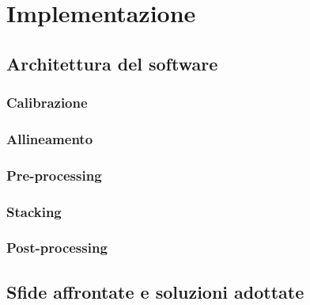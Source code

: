 \chapter{Implementazione} \label{chap:implementation}

\section{Architettura del software} \label{sec:architecture}

\subsection{Calibrazione} \label{subsec:calibration_impl}

\subsection{Allineamento} \label{subsec:alignment_impl}

\subsection{Pre-processing} \label{subsec:preprocessing_impl}

\subsection{Stacking} \label{subsec:stacking_impl}

\subsection{Post-processing} \label{subsec:postprocess_impl}

\section{Sfide affrontate e soluzioni adottate} \label{sec:challenges}

\cleardoublepage